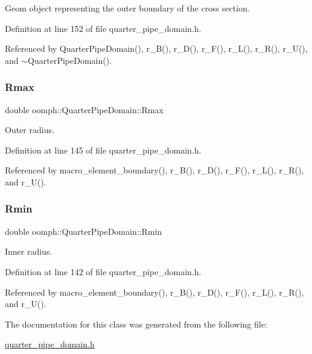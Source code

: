 Geom object representing the outer boundary of the cross section. 



Definition at line 152 of file quarter\+\_\+pipe\+\_\+domain.\+h.



Referenced by Quarter\+Pipe\+Domain(), r\+\_\+\+B(), r\+\_\+\+D(), r\+\_\+\+F(), r\+\_\+\+L(), r\+\_\+\+R(), r\+\_\+\+U(), and $\sim$\+Quarter\+Pipe\+Domain().

\mbox{\label{classoomph_1_1QuarterPipeDomain_a5e2252883456cd65902663fda09296d5}} 
\subsubsection{\texorpdfstring{Rmax}{Rmax}}
{\footnotesize\ttfamily double oomph\+::\+Quarter\+Pipe\+Domain\+::\+Rmax\hspace{0.3cm}{\ttfamily [private]}}



Outer radius. 



Definition at line 145 of file quarter\+\_\+pipe\+\_\+domain.\+h.



Referenced by macro\+\_\+element\+\_\+boundary(), r\+\_\+\+B(), r\+\_\+\+D(), r\+\_\+\+F(), r\+\_\+\+L(), r\+\_\+\+R(), and r\+\_\+\+U().

\mbox{\label{classoomph_1_1QuarterPipeDomain_ac71370e6c78fd37aa59e7a52d62d1cbe}} 
\subsubsection{\texorpdfstring{Rmin}{Rmin}}
{\footnotesize\ttfamily double oomph\+::\+Quarter\+Pipe\+Domain\+::\+Rmin\hspace{0.3cm}{\ttfamily [private]}}



Inner radius. 



Definition at line 142 of file quarter\+\_\+pipe\+\_\+domain.\+h.



Referenced by macro\+\_\+element\+\_\+boundary(), r\+\_\+\+B(), r\+\_\+\+D(), r\+\_\+\+F(), r\+\_\+\+L(), r\+\_\+\+R(), and r\+\_\+\+U().



The documentation for this class was generated from the following file\+:\begin{DoxyCompactItemize}
\item 
\hyperlink{quarter__pipe__domain_8h}{quarter\+\_\+pipe\+\_\+domain.\+h}\end{DoxyCompactItemize}
